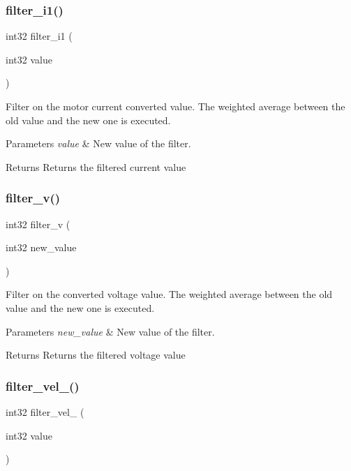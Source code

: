 \subsubsection{filter\+\_\+i1()}
{\footnotesize\ttfamily int32 filter\+\_\+i1 (\begin{DoxyParamCaption}\item[{int32}]{value }\end{DoxyParamCaption})}

Filter on the motor current converted value. The weighted average between the old value and the new one is executed.


\begin{DoxyParams}{Parameters}
{\em value} & New value of the filter.\\
\hline
\end{DoxyParams}
\begin{DoxyReturn}{Returns}
Returns the filtered current value 
\end{DoxyReturn}
\mbox{\label{utils_8c_af034fe9aa479d4adfc6e75e20b2f7ff3}} 
\subsubsection{filter\+\_\+v()}
{\footnotesize\ttfamily int32 filter\+\_\+v (\begin{DoxyParamCaption}\item[{int32}]{new\+\_\+value }\end{DoxyParamCaption})}

Filter on the converted voltage value. The weighted average between the old value and the new one is executed.


\begin{DoxyParams}{Parameters}
{\em new\+\_\+value} & New value of the filter.\\
\hline
\end{DoxyParams}
\begin{DoxyReturn}{Returns}
Returns the filtered voltage value 
\end{DoxyReturn}
\mbox{\label{utils_8c_a19d6395ebc48dcac09068a5c6eb19596}} 
\subsubsection{filter\+\_\+vel\+\_()}
{\footnotesize\ttfamily int32 filter\+\_\+vel\+\_ (\begin{DoxyParamCaption}\item[{int32}]{value }\end{DoxyParamCaption})}

